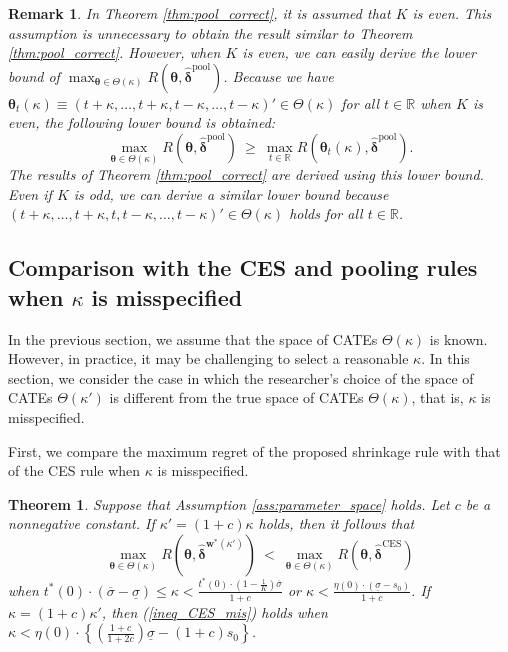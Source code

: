 \documentclass[12pt,a4paper]{article}
\newtheorem{Theorem}{Theorem}
\newtheorem{Remark}{Remark}
\begin{document}
\begin{Remark}\label{rem:pool_correct}
In Theorem \ref{thm:pool_correct}, it is assumed that $K$ is even. This assumption is unnecessary to obtain the result similar to Theorem \ref{thm:pool_correct}. However, when $K$ is even, we can easily derive the lower bound of $\max_{\bm{\theta} \in \Theta(\kappa)}R(\bm{\theta},\hat{\bm{\delta}}^{\mathrm{pool}})$. Because we have $\bm{\theta}_t(\kappa) \equiv (t+\kappa, \ldots, t+\kappa, t-\kappa, \ldots, t-\kappa)' \in \Theta(\kappa)$ for all $t \in \mathbb{R}$ when $K$ is even, the following lower bound is obtained:
$$
\max_{\bm{\theta} \in \Theta(\kappa)}R(\bm{\theta},\hat{\bm{\delta}}^{\mathrm{pool}}) \ \geq \ \max_{t \in \mathbb{R}} R(\bm{\theta}_t(\kappa),\hat{\bm{\delta}}^{\mathrm{pool}}).
$$
The results of Theorem \ref{thm:pool_correct} are derived using this lower bound. Even if $K$ is odd, we can derive a similar lower bound because $(t+\kappa, \ldots, t+\kappa, t, t-\kappa, \ldots, t-\kappa)' \in \Theta(\kappa)$ holds for all $t \in \mathbb{R}$. 
\end{Remark}


\subsection{Comparison with the CES and pooling rules when $\kappa$ is misspecified}\label{SubSec:misspecified}
In the previous section, we assume that the space of CATEs $\Theta (\kappa)$ is known. However, in practice, it may be challenging to select a reasonable $\kappa$. In this section, we consider the case in which the researcher's choice of the space of CATEs $\Theta (\kappa')$ is different from the true space of CATEs $\Theta (\kappa)$, that is, $\kappa$ is misspecified.

First, we compare the maximum regret of the proposed shrinkage rule with that of the CES rule when $\kappa$ is misspecified.

\begin{Theorem}\label{thm:CES_mis}
Suppose that Assumption \ref{ass:parameter_space} holds. Let $c$ be a nonnegative constant. If $\kappa' = (1+c)\kappa$ holds, then it follows that
\begin{equation}
\max_{\bm{\theta} \in \Theta(\kappa)} R(\bm{\theta},\hat{\bm{\delta}}^{\bm{w}^{\ast}(\kappa')}) \ < \ \max_{\bm{\theta} \in \Theta(\kappa)} R(\bm{\theta},\hat{\bm{\delta}}^{\mathrm{CES}}) \label{ineq_CES_mis}
\end{equation}
when $t^{\ast}(0) \cdot (\overline{\sigma} - \underline{\sigma}) \leq \kappa < \frac{t^{\ast}(0) \cdot \left(1- \frac{1}{K}\right) \overline{\sigma}}{1+c}$ or $\kappa <  \frac{\eta(0) \cdot (\underline{\sigma} - s_0)}{1+c}$. If $\kappa = (1+c)\kappa'$, then (\ref{ineq_CES_mis}) holds when $\kappa < \eta(0) \cdot \left\{ \left( \frac{1+c}{1+2c}\right)  \underline{\sigma} - (1+c)s_0 \right\}$.
\end{Theorem}
\end{document}
